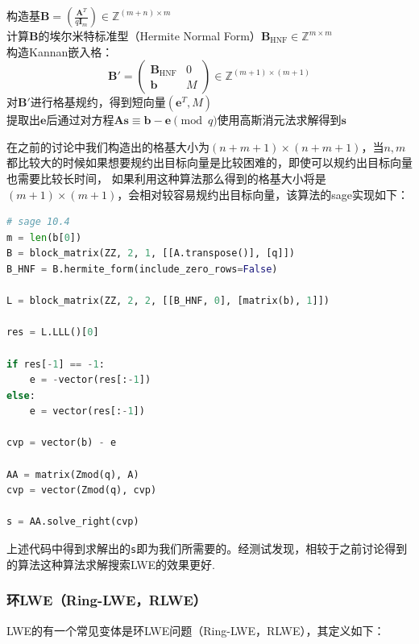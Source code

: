 \documentclass{book}
\numberwithin{equation}{subsubsection}
\begin{document}
\begin{algorithm}[h!]
    \caption{利用Kannan嵌入法求解LWE}
    构造基$\pmb{B}=\left(\frac{\pmb{A}^{T}}{q\pmb{I}_m}\right)\in\mathbb{Z}^{(m+n)\times m}$\\
    计算$\pmb{B}$的埃尔米特标准型（Hermite Normal Form）$\pmb{B}_{\text{HNF}}\in\mathbb{Z}^{m\times m}$\\
    构造Kannan嵌入格：
    \begin{equation}
        \pmb{B}'=\left(\begin{matrix}
            \pmb{B}_{\text{HNF}}&0\\
            \pmb{b}&M
        \end{matrix}\right)\in\mathbb{Z}^{(m+1)\times(m+1)}
        \nonumber
    \end{equation}
    对$\pmb{B}'$进行格基规约，得到短向量$(\pmb{e}^{T},M)$\\
    提取出$\pmb{e}$后通过对方程$\pmb{A}\pmb{s}\equiv\pmb{b}-\pmb{e}\pmod{q}$使用高斯消元法求解得到$\pmb{s}$\\
\end{algorithm} 
在之前的讨论中我们构造出的格基大小为$(n+m+1)\times(n+m+1)$，当$n,m$都比较大的时候如果想要规约出目标向量是比较困难的，即使可以规约出目标向量也需要比较长时间，
如果利用这种算法那么得到的格基大小将是$(m+1)\times(m+1)$，会相对较容易规约出目标向量，该算法的sage实现如下：
\begin{lstlisting}[language=Python,basicstyle=\ttfamily,breaklines=true,keywordstyle=\bfseries\color{blue}]
# sage 10.4
m = len(b[0])
B = block_matrix(ZZ, 2, 1, [[A.transpose()], [q]])
B_HNF = B.hermite_form(include_zero_rows=False)

L = block_matrix(ZZ, 2, 2, [[B_HNF, 0], [matrix(b), 1]])

res = L.LLL()[0]

if res[-1] == -1:
    e = -vector(res[:-1])
else:
    e = vector(res[:-1])

cvp = vector(b) - e

AA = matrix(Zmod(q), A)
cvp = vector(Zmod(q), cvp)

s = AA.solve_right(cvp)
\end{lstlisting}
上述代码中得到求解出的\texttt{s}即为我们所需要的。经测试发现，相较于之前讨论得到的算法这种算法求解搜索LWE的效果更好.

\subsubsection{环LWE（Ring-LWE，RLWE）}
LWE的有一个常见变体是环LWE问题（Ring-LWE，RLWE），其定义如下：
\end{document}

